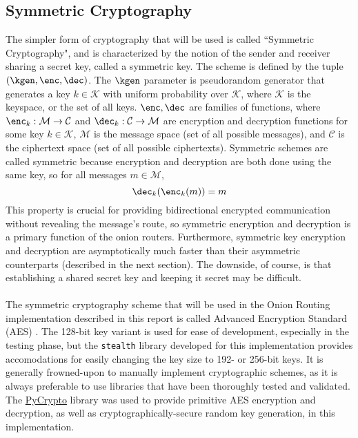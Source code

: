 \documentclass[10pt]{report}
\begin{document}
\begin{appendix}
	\section{Symmetric Cryptography}
	The simpler form of cryptography that will be used is called ``Symmetric Cryptography", and is
	characterized by the notion of the sender and receiver sharing a secret key, called a symmetric
	key. The scheme is defined by the tuple $(\kgen,\enc,\dec)$. The $\kgen$ parameter is pseudorandom
	generator that generates a key $k\in\mathcal{K}$ with uniform probability over $\mathcal{K}$,
	where $\mathcal{K}$ is the keyspace, or the set of all keys. $\enc,\dec$ are families of
	functions, where $\enc_k: \mathcal{M}\rightarrow\mathcal{C}$ and $\dec_k:
	\mathcal{C}\rightarrow\mathcal{M}$ are encryption and decryption functions for some key
	$k\in\mathcal{K}$, $\mathcal{M}$ is the message space (set of all possible messages), and
	$\mathcal{C}$ is the ciphertext space (set of all possible ciphertexts). Symmetric schemes are
	called symmetric because encryption and decryption are both done using the same key, so for all
	messages $m\in\mathcal{M}$,
	\begin{equation}
		\dec_k(\enc_k(m)) = m
	\end{equation}
	This property is crucial for providing bidirectional encrypted communication without revealing
	the message's route, so symmetric encryption and decryption is a primary function of the onion
	routers. Furthermore, symmetric key encryption and decryption are asymptotically much faster
	than their asymmetric counterparts \cite{SymmetricVsAsymmetric} (described in the next section).
	The downside, of course, is that establishing a shared secret key and keeping it secret may be
	difficult.\\\\
	The symmetric cryptography scheme that will be used in the Onion Routing
	implementation described in this report is called Advanced Encryption Standard (AES) \cite{AES}.
	The 128-bit key variant is used for ease of development, especially in the testing phase, but
	the \texttt{stealth} library developed for this implementation provides accomodations for easily
	changing the key size to 192- or 256-bit keys. It is generally frowned-upon to manually
	implement cryptographic schemes, as it is always preferable to use libraries that have been
	thoroughly tested and validated. The \href{https://www.dlitz.net/software/pycrypto/}{PyCrypto}
	library was used to provide primitive AES encryption and decryption, as well as
	cryptographically-secure random key generation, in this implementation.

\end{appendix}
\end{document}
